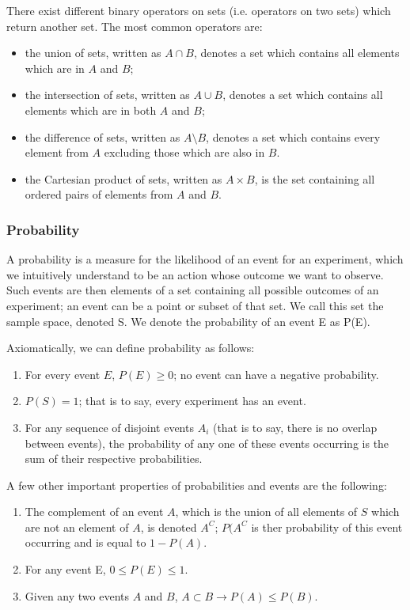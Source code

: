 There exist different binary operators on sets (i.e. operators on two
sets) which return another set. The most common operators are:
\begin{itemize}
\item the union of sets, written as $A \cap B$, denotes a set which
contains all elements which are in $A$ and $B$;
\item the intersection of sets, written as $A \cup B$, denotes a set
which contains all elements which are in both $A$ and $B$;
\item the difference of sets, written as $A \setminus B$, denotes a
set which contains every element from $A$ excluding those which are
also in $B$.
\item the Cartesian product of sets, written as $A \times B$, is the
set containing all ordered pairs of elements from $A$ and $B$.
\end{itemize}

\subsubsection{Probability}
\label{sec:probability}

A probability is a measure for the likelihood of an event for an
experiment, which we intuitively understand to be an action whose
outcome we want to observe. Such events are then elements of a set
containing all possible outcomes of an experiment; an event can be a
point or subset of that set. We call this set the sample space, denoted S. We denote the probability of an event E as P(E).

Axiomatically, we can define probability as follows:

\begin{enumerate}
  \item For every event $E$, $P(E) \geq 0$; no event can have a negative probability.
  \item $P(S) = 1$; that is to say, every experiment has an event.
  \item For any sequence of disjoint events $A_i$ (that is to say,
    there is no overlap between events), the probability of any one of
    these events occurring is the sum of their respective probabilities.
\end{enumerate}

A few other important properties of probabilities and events are the following:

\begin{enumerate}
  \item The complement of an event $A$, which is the union of all
    elements of $S$ which are not an element of $A$, is denoted $A^C$;
    $P(A^C$ is ther probability of this event occurring and is equal to $1
    - P(A)$.
  \item For any event E, $0 \leq P(E) \leq 1$.
  \item Given any two events $A$ and $B$, $A \subset B \rightarrow P(A) \leq P(B)$.
\end{enumerate}

